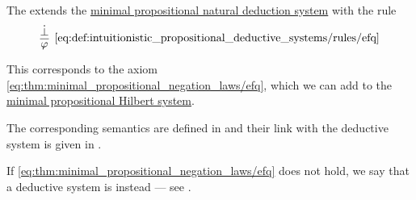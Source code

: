\begin{definition}\label{def:intuitionistic_propositional_deductive_systems}
  The  extends the \hyperref[def:minimal_propositional_natural_deduction_system]{minimal propositional natural deduction system} with the rule
  \begin{equation*}\taglabel[\logic{EFQ}]{eq:def:intuitionistic_propositional_deductive_systems/rules/efq}
    \begin{prooftree}
      \hypo{ \synbot }
      \infer1[\ref{eq:def:intuitionistic_propositional_deductive_systems/rules/efq}]{ \varphi }
    \end{prooftree}
  \end{equation*}
\end{definition}
\begin{comments}
  \item This corresponds to the axiom \eqref{eq:thm:minimal_propositional_negation_laws/efq}, which we can add to the \hyperref[def:minimal_propositional_hilbert_system]{minimal propositional Hilbert system}.
  \item The corresponding semantics are defined in  and their link with the deductive system is given in .
  \item If \eqref{eq:thm:minimal_propositional_negation_laws/efq} does not hold, we say that a deductive system is  instead --- see \cite{StanfordPlato:paraconsistent_logic}.
\end{comments}

